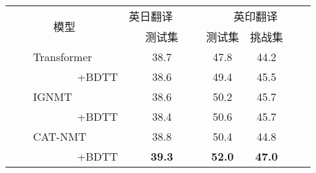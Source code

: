 
\begin{table}[!htbp]
    \label{tab:5_enjp_enhi}
    \centering
    \footnotesize%
    \setlength{\tabcolsep}{4pt}%
    \renewcommand{\arraystretch}{1.2}%
    \begin{tabular}{llccc}
    \hline
    \multicolumn{2}{c}{\multirow{2}{*}{模型}} & 英日翻译~~~~ & \multicolumn{2}{c}{英印翻译}\\\cmidrule(r){3-3} \cmidrule(r){4-5}%
           &        & 测试集  & 测试集  & 挑战集~~~~  \\\hline
    
    \multicolumn{2}{l}{~~~~Transformer}    & 38.7           & 47.8           & 44.2~~~~  \\
    \multicolumn{2}{l}{~~~~~~~~~~~~+BDTT} & 38.6           & 49.4           & 45.5~~~~   \\\hline
    \multicolumn{2}{l}{~~~~IGNMT}            & 38.6           & 50.2           & 45.7~~~~  \\
    \multicolumn{2}{l}{~~~~~~~~~~~~+BDTT}        & 38.4           & 50.6           & 45.7~~~~  \\\hline
    \multicolumn{2}{l}{~~~~CAT-NMT}       & 38.8           & 50.4           & 44.8~~~~  \\
    \multicolumn{2}{l}{~~~~~~~~~~~~+BDTT}     & \textbf{39.3}  & \textbf{52.0}  & \textbf{47.0}~~~~  \\
     \hline
    \end{tabular}%
\end{table}%